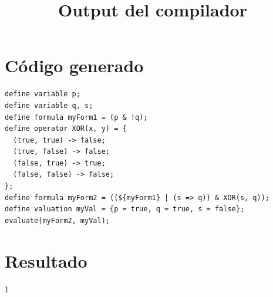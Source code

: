 \documentclass{article}
\title{Output del compilador}
\date{}
\begin{document}
\maketitle
\section*{Código generado}
\begin{lstlisting}[style=mystyle]
define variable p;
define variable q, s;
define formula myForm1 = (p & !q);
define operator XOR(x, y) = {
  (true, true) -> false;
  (true, false) -> false;
  (false, true) -> true;
  (false, false) -> false;
};
define formula myForm2 = ((${myForm1} | (s => q)) & XOR(s, q));
define valuation myVal = {p = true, q = true, s = false};
evaluate(myForm2, myVal);
\end{lstlisting}

\section*{Resultado}
\begin{tcolorbox}[colback=blue!5!white, colframe=blue!75!black, title=Resultado de evaluación]
1
\end{tcolorbox}
\end{document}

